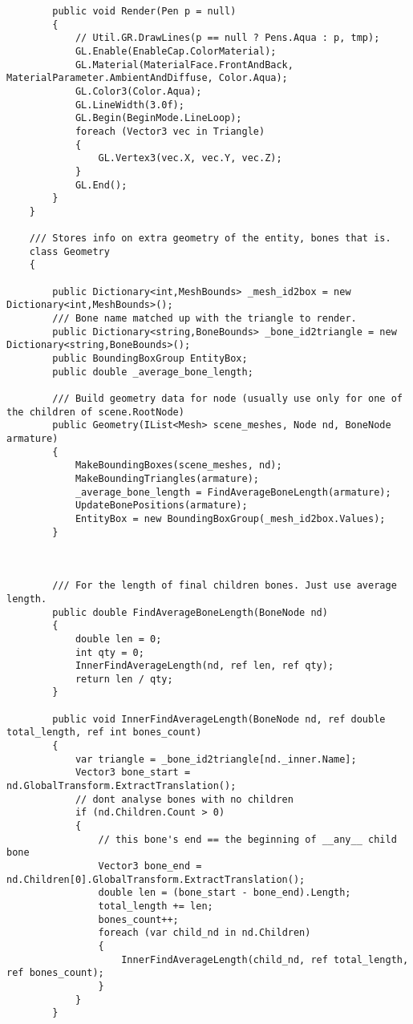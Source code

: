 \begin{scriptsize}
\begin{verbatim}
        public void Render(Pen p = null)
        {
            // Util.GR.DrawLines(p == null ? Pens.Aqua : p, tmp);
            GL.Enable(EnableCap.ColorMaterial);
            GL.Material(MaterialFace.FrontAndBack, MaterialParameter.AmbientAndDiffuse, Color.Aqua);
            GL.Color3(Color.Aqua);
            GL.LineWidth(3.0f);
            GL.Begin(BeginMode.LineLoop);
            foreach (Vector3 vec in Triangle)
            {
                GL.Vertex3(vec.X, vec.Y, vec.Z);
            }
            GL.End();
        }
    }

    /// Stores info on extra geometry of the entity, bones that is.
    class Geometry
    {

        public Dictionary<int,MeshBounds> _mesh_id2box = new Dictionary<int,MeshBounds>();
        /// Bone name matched up with the triangle to render.
        public Dictionary<string,BoneBounds> _bone_id2triangle = new Dictionary<string,BoneBounds>();
        public BoundingBoxGroup EntityBox;
        public double _average_bone_length;

        /// Build geometry data for node (usually use only for one of the children of scene.RootNode)
        public Geometry(IList<Mesh> scene_meshes, Node nd, BoneNode armature)
        {
            MakeBoundingBoxes(scene_meshes, nd);
            MakeBoundingTriangles(armature);
            _average_bone_length = FindAverageBoneLength(armature);
            UpdateBonePositions(armature);
            EntityBox = new BoundingBoxGroup(_mesh_id2box.Values);
        }
        


        /// For the length of final children bones. Just use average length.
        public double FindAverageBoneLength(BoneNode nd)
        {
            double len = 0;
            int qty = 0;
            InnerFindAverageLength(nd, ref len, ref qty);
            return len / qty;
        }

        public void InnerFindAverageLength(BoneNode nd, ref double total_length, ref int bones_count)
        {
            var triangle = _bone_id2triangle[nd._inner.Name];
            Vector3 bone_start = nd.GlobalTransform.ExtractTranslation();
            // dont analyse bones with no children
            if (nd.Children.Count > 0)
            {
                // this bone's end == the beginning of __any__ child bone
                Vector3 bone_end = nd.Children[0].GlobalTransform.ExtractTranslation();
                double len = (bone_start - bone_end).Length;
                total_length += len;
                bones_count++;
                foreach (var child_nd in nd.Children)
                {
                    InnerFindAverageLength(child_nd, ref total_length, ref bones_count);
                }
            }
        }


\end{verbatim}
\end{scriptsize}
